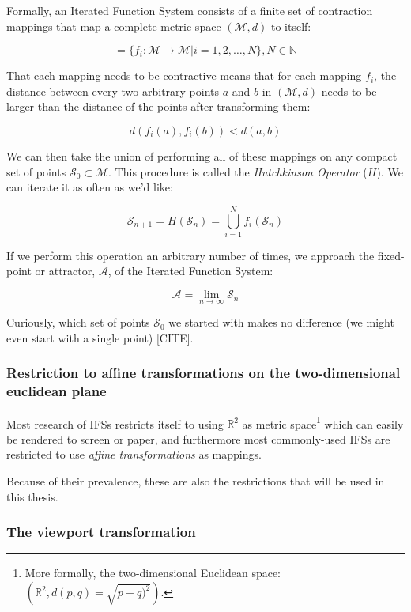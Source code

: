 \documentclass[11pt]{article}
\begin{document}
Formally, an Iterated Function System consists of a finite set of contraction mappings that map a complete metric space \((\mathcal{M}, d)\) to itself:

$$ = \{ f_i : \mathcal{M} \rightarrow \mathcal{M} | i = 1, 2, \ldots, N \}, N \in \mathbb{N}$$

That each mapping needs to be contractive means that for each mapping \(f_i\), the distance between every two arbitrary points \(a\) and \(b\) in \((\mathcal{M}, d)\) needs to be larger than the distance of the points after transforming them:

$$d(f_i(a), f_i(b)) < d(a, b)$$

We can then take the union of performing all of these mappings on any compact set of points \(\mathcal{S}_0 \subset \mathcal{M}\). This procedure is called the \emph{Hutchkinson Operator} (\(H\)). 
We can iterate it as often as we'd like:

$$ \mathcal{S}_{n + 1} = H(\mathcal{S}_n) = \bigcup_{i=1}^{N} f_i(\mathcal{S}_n) $$

If we perform this operation an arbitrary number of times, we approach the fixed-point or attractor, \(\mathcal{A}\), of the Iterated Function System:

$$\mathcal{A} = \lim_{n \rightarrow \infty} \mathcal{S}_n$$

Curiously, which set of points \(\mathcal{S}_0\) we started with makes no difference (we might even start with a single point) [CITE].

\subsubsection{Restriction to affine transformations on the two-dimensional euclidean plane}
\label{sec:orgef26424}

Most research of IFSs restricts itself to using \(\mathbb{R}^2\) as metric space\footnote{More formally, the two-dimensional Euclidean space: \(\left(\mathbb{R}^2, d(p, q) = \sqrt{p - q)^2}\right)\).} which can easily be rendered to screen or paper,
and furthermore most commonly-used IFSs are restricted to use \emph{affine transformations} as mappings.

Because of their prevalence, these are also the restrictions that will be used in this thesis.

\subsubsection{The viewport transformation}
\label{sec:org8aab46c}
\label{subsection:viewport_transformation}
\end{document}
